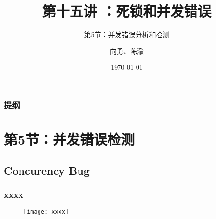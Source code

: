 


\title[第15讲]{第十五讲 ：死锁和并发错误} %
\subtitle{第5节：并发错误分析和检测}
\author{向勇、陈渝} %
\date{\today} %




\begin{frame}
\titlepage %
\end{frame}

\begin{frame}
\frametitle{提纲} %
\tableofcontents %
\end{frame}
\section{第5节：并发错误检测} %
\subsection{Concurency Bug} %
\begin{frame}[fragile]
    \frametitle{xxxx}
    \begin{figure}
    \texttt{[image: xxxx]}
    \end{figure}
\end{frame}
